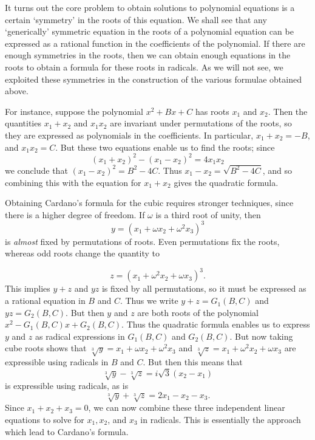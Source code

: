 It turns out the core problem to obtain solutions to polynomial equations is a certain `symmetry' in the roots of this equation. We shall see that any `generically' symmetric equation in the roots of a polynomial equation can be expressed as a rational function in the coefficients of the polynomial. If there are enough symmetries in the roots, then we can obtain enough equations in the roots to obtain a formula for these roots in radicals. As we will not see, we exploited these symmetries in the construction of the various formulae obtained above.

%
%
%
%

For instance, suppose the polynomial $x^2 + Bx + C$ has roots $x_1$ and $x_2$. Then the quantities $x_1 + x_2$ and $x_1x_2$ are invariant under permutations of the roots, so they are expressed as polynomials in the coefficients. In particular, $x_1 + x_2 = -B$, and $x_1x_2 = C$. But these two equations enable us to find the roots; since
%
\[ (x_1 + x_2)^2 - (x_1 - x_2)^2 = 4x_1x_2 \]
%
we conclude that $(x_1 - x_2)^2 = B^2 - 4C$. Thus $x_1 - x_2 = \sqrt{B^2 - 4C}$, and so combining this with the equation for $x_1 + x_2$ gives the quadratic formula.

Obtaining Cardano's formula for the cubic requires stronger techniques, since there is a higher degree of freedom. If $\omega$ is a third root of unity, then
%
\[ y = (x_1 + \omega x_2 + \omega^2 x_3)^3 \]
%
is \emph{almost} fixed by permutations of roots. Even permutations fix the roots, whereas odd roots change the quantity to

\[ z = (x_1 + \omega^2 x_2 + \omega x_3)^3. \]
%
This implies $y + z$ and $yz$ is fixed by all permutations, so it must be expressed as a rational equation in $B$ and $C$. Thus we write $y + z = G_1(B,C)$ and $yz = G_2(B,C)$. But then $y$ and $z$ are both roots of the polynomial $x^2 - G_1(B,C) x + G_2(B,C)$. Thus the quadratic formula enables us to express $y$ and $z$ as radical expressions in $G_1(B,C)$ and $G_2(B,C)$. But now taking cube roots shows that $\sqrt[3]{y} = x_1 + \omega x_2 + \omega^2 x_3$ and $\sqrt[3]{z} = x_1 + \omega^2 x_2 + \omega x_3$ are expressible using radicals in $B$ and $C$. But then this means that
%
\[ \sqrt[3]{y} - \sqrt[3]{z} = i \sqrt{3} (x_2 - x_1) \]
%
is expressible using radicals, as is
%
\[ \sqrt[3]{y} + \sqrt[3]{z} = 2x_1 - x_2 - x_3. \]
%
Since $x_1 + x_2 + x_3 = 0$, we can now combine these three independent linear equations to solve for $x_1,x_2$, and $x_3$ in radicals. This is essentially the approach which lead to Cardano's formula.

